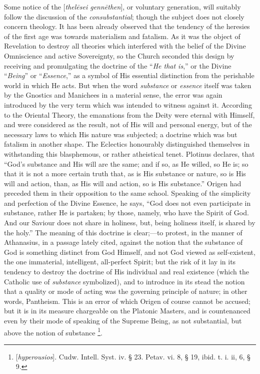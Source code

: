 Some notice of the [\emph{thel\={e}sei genn\={e}then}], or
voluntary generation, will suitably follow the discussion of the \emph{consubstantial}; though the subject does not closely concern
theology. It has been already observed that the tendency of the
heresies of the first age was towards materialism and fatalism. As it
was the object of Revelation to destroy all theories which interfered
with the belief of the Divine Omniscience and active Sovereignty, so
the Church seconded this design by receiving and promulgating the
doctrine of the ``\emph{He that is},'' or the Divine ``\emph{Being}''
or ``\emph{Essence},'' as a symbol of His essential
distinction from the perishable world in which He acts. But when the
word \emph{substance} or \emph{essence} itself was taken by the
Gnostics and Manichees in a material sense, the error was again
introduced by the very term which was intended to witness against it.
According to the Oriental Theory, the emanations from the Deity were
eternal with Himself, and were considered as the result, not of His
will and personal energy, but of the necessary laws to which His
nature was subjected; a doctrine which was but fatalism in another
shape. The Eclectics honourably distinguished themselves in
withstanding this blasphemous, or rather atheistical tenet. Plotinus
declares, that ``God's substance and His will are the same; and if
so, as He willed, so He is; so that it is not a more certain truth
that, as is His substance or nature, so is His will and action, than,
as His will and action, so is His substance.'' Origen had preceded
them in their opposition to the same school. Speaking of the
simplicity and perfection of the Divine Essence, he says, ``God
does not even participate in substance, rather He is partaken; by
those, namely, who have the Spirit of God. And our Saviour does not
share in holiness, but, being holiness itself, is shared by the holy.'' The meaning of this doctrine is clear;—to protest, in
the manner of Athanasius, in a passage lately cited, against the
notion that the substance of God is something distinct from God
Himself, and not God viewed as self-existent, the one immaterial,
intelligent, all-perfect Spirit; but the risk of it lay in its
tendency to destroy the doctrine of His individual and real existence
(which the Catholic use of \emph{substance} symbolized), and to
introduce in its stead the notion that a quality or mode of acting was
the governing principle of nature; in other words, Pantheism. This is
an error of which Origen of course cannot be accused; but it is in its
measure chargeable on the Platonic Masters, and is countenanced even
by their mode of speaking of the Supreme Being, as not substantial,
but above the notion of substance \footnote{[\emph{hyperousios}]. Cudw. Intell. Syst.
iv. § 23. Petav. vi. 8, § 19, ibid. t. i. ii, 6, § 9.}.

